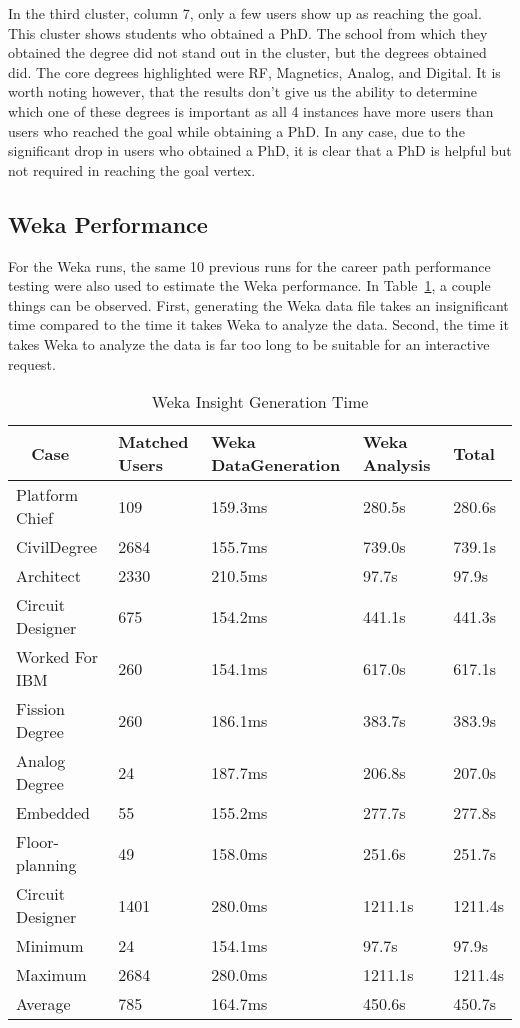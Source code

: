 In the third cluster, column 7, only a few users show up as reaching the goal. 
This cluster shows students who obtained a PhD.  The school from which they
obtained the degree did not stand out in the cluster, but the degrees obtained
did.  The core degrees highlighted were RF, Magnetics, Analog, and Digital.  It
is worth noting however, that the results don't give us the ability to determine
which one of these degrees is important as all 4 instances have more users than
users who reached the goal while obtaining a PhD.  In any case, due to the
significant drop in users who obtained a PhD, it is clear that a PhD is helpful
but not required in reaching the goal vertex.

\subsection{Weka Performance}
For the Weka runs, the same 10 previous runs for the career path performance
testing were also used to estimate the Weka performance.  In
Table~\ref{tab:weka-perf}, a couple things can be observed.  First, generating
the Weka data file takes an insignificant time compared to the time it takes
Weka to analyze the data.  Second, the time it takes Weka to analyze the data
is far too long to be suitable for an interactive request.  

 \begin{table}[H]
  \centering
  \begin{tabular}{|p{17mm}|p{16mm}|p{20mm}|p{19mm}|p{20mm}|}
  \hline
  \
  Case&Matched Users&Weka Data\newline Generation&Weka \newline Analysis&Total\\
  \hline\hline
  Platform Chief&109&159.3ms&280.5s&280.6s\\ \hline
  Civil\newline Degree&2684&155.7ms&739.0s&739.1s\\ \hline 
  Architect&2330&210.5ms&97.7s&97.9s\\ \hline
  Circuit Designer&675&154.2ms&441.1s&441.3s\\ \hline
  Worked For IBM&260&154.1ms&617.0s&617.1s\\ \hline
  Fission Degree&260&186.1ms&383.7s&383.9s\\ \hline
  Analog Degree&24&187.7ms&206.8s&207.0s\\ \hline
  Embedded&55&155.2ms&277.7s&277.8s\\ \hline
  Floor- \newline planning&49&158.0ms&251.6s&251.7s\\ \hline
  Circuit Designer&1401&280.0ms&1211.1s&1211.4s\\ \hline
  \hline\hline
  Minimum&24&154.1ms&97.7s&97.9s\\ \hline
  Maximum&2684&280.0ms&1211.1s&1211.4s\\ \hline
  Average&785&164.7ms&450.6s&450.7s\\ \hline
  \end{tabular}
  \caption{Weka Insight Generation Time}
  \label{tab:weka-perf}
\end{table}

